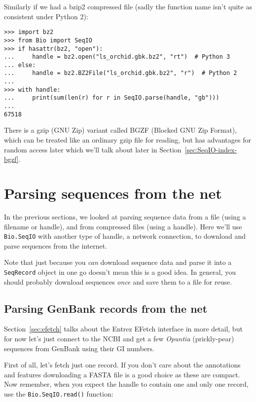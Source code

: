 Similarly if we had a bzip2 compressed file (sadly the function name isn't
quite as consistent under Python 2):

\begin{verbatim}
>>> import bz2
>>> from Bio import SeqIO
>>> if hasattr(bz2, "open"):
...     handle = bz2.open("ls_orchid.gbk.bz2", "rt")  # Python 3
... else:
...     handle = bz2.BZ2File("ls_orchid.gbk.bz2", "r")  # Python 2
...
>>> with handle:
...     print(sum(len(r) for r in SeqIO.parse(handle, "gb")))
...
67518
\end{verbatim}

There is a gzip (GNU Zip) variant called BGZF (Blocked GNU Zip Format),
which can be treated like an ordinary gzip file for reading, but has
advantages for random access later which we'll talk about later in
Section~\ref{sec:SeqIO-index-bgzf}.

\section{Parsing sequences from the net}
\label{sec:SeqIO_Online}
In the previous sections, we looked at parsing sequence data from a file
(using a filename or handle), and from compressed files (using a handle).
Here we'll use \verb|Bio.SeqIO| with another type of handle, a network
connection, to download and parse sequences from the internet.

Note that just because you \emph{can} download sequence data and parse it into
a \verb|SeqRecord| object in one go doesn't mean this is a good idea.
In general, you should probably download sequences \emph{once} and save them to
a file for reuse.

\subsection{Parsing GenBank records from the net}
\label{sec:SeqIO_GenBank_Online}
Section~\ref{sec:efetch} talks about the Entrez EFetch interface in more detail,
but for now let's just connect to the NCBI and get a few \textit{Opuntia} (prickly-pear)
sequences from GenBank using their GI numbers.

First of all, let's fetch just one record.  If you don't care about the
annotations and features downloading a FASTA file is a good choice as these
are compact.  Now remember, when you expect the handle to contain one and
only one record, use the \verb|Bio.SeqIO.read()| function:

